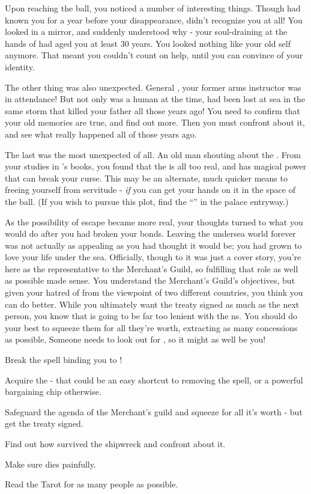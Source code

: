 \documentclass[char]{NeptuneBall}
\begin{document}
Upon reaching the ball, you noticed a number of interesting things. Though \cAriel{} had known you for a year before your disappearance, \cAriel{\they} didn't recognize you at all! You looked in a mirror, and suddenly understood why - your soul-draining at the hands of \cWitch{} had aged you at least 30 years. You looked nothing like your old self anymore. That meant you couldn't count on \cAriel{\their} help, until you can convince \cAriel{\them} of your identity.

The other thing was also unexpected. General \cGeneral{}, your former arms instructor was in attendance! But not only was \cGeneral{\they} a human at the time, \cGeneral{\they} had been lost at sea in the same storm that killed your father all those years ago! You need to confirm that your old memories are true, and find out more. Then you must confront \cGeneral{\them} about it, and see what really happened all of those years ago.

The last was the most unexpected of all. An old man shouting about the \iWishingStone{\MYname}. From your studies in \cWitch{}'s books, you found that the \iWishingStone{\MYname} is all too real, and has magical power that can break your curse. This may be an alternate, much quicker means to freeing yourself from servitude - \emph{if} you can get your hands on it in the space of the ball. (If you wish to pursue this plot, find the ``\sOldMan{}'' in the palace entryway.)

As the possibility of escape became more real, your thoughts turned to what you would do after you had broken your bonds. Leaving the undersea world forever was not actually as appealing as you had thought it would be; you had grown to love your life under the sea. Officially, though to \cWitch{} it was just a cover story, you're here as the representative to the Merchant's Guild, so fulfilling that role as well as possible made sense. You understand the Merchant's Guild's objectives, but given your hatred of \pPacifica{} from the viewpoint of two different countries, you think you can do better. While you ultimately want the treaty signed as much as the next person, you know that \cKing{\King} \cKing{} is going to be far too lenient with the \pPacifica{}ns. You should do your best to squeeze them for all they're worth, extracting as many concessions as possible, Someone needs to look out for \pAtlantis{}, so it might as well be you!

\begin{itemz}[Goals]
	\item Break the spell binding you to \cWitch{}!
	\item Acquire the \iWishingStone{} - that could be an easy shortcut to removing the spell, or a powerful bargaining chip otherwise.
  \item Safeguard the agenda of the Merchant's guild and squeeze \pPacifica{} for all it's worth - but get the treaty signed.
	\item Find out how \cGeneral{} survived the shipwreck and confront \cGeneral{\them} about it.
	\item Make sure \cWitch{} dies painfully.
	\item Read the Tarot for as many people as possible.
\end{itemz}
\end{document}
